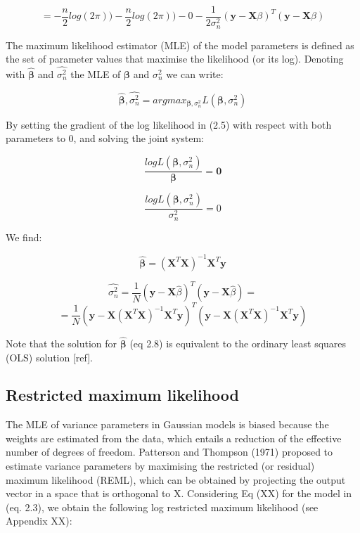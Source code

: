 \[= -\frac{n}{2}log(2\pi)) - \frac{n}{2}log(2\pi))- 0 - \frac{1}{2\sigma_n^2}(\mathbf{y}-\mathbf{X}\beta)^T(\mathbf{y}-\mathbf{X}\beta)  \]


The maximum likelihood estimator (MLE) of the model parameters is defined as the set of parameter values that maximise the likelihood (or its log). Denoting with $\hat{\boldsymbol{\beta}}$ and $\hat{\sigma_n^2}$ the MLE of $\boldsymbol{\beta}$ and $\sigma_n^2$ we can write:

\[ \hat{\boldsymbol{\beta}},\hat{\sigma_n^2} = argmax_{\boldsymbol{\beta},\sigma_n^2}L(\boldsymbol{\beta}, \sigma_n^2) \]

\vspace{2mm} 
By setting the gradient of the log likelihood in (2.5) with respect with both parameters to 0, and solving the joint system: 


\[ \dfrac{logL(\boldsymbol{\beta}, \sigma_n^2)}{\boldsymbol{\beta}} = \mathbf{0} \]

\[ \dfrac{logL(\boldsymbol{\beta}, \sigma_n^2)}{\sigma_n^2} = 0 \]


We find:

\[ \hat{\boldsymbol{\beta}} = (\mathbf{X}^T\mathbf{X})^{-1}\mathbf{X}^T\mathbf{y} \]

\[ \hat{\sigma_n^2}  = \frac{1}{N}(\mathbf{y}-\mathbf{X}\hat{\beta})^T(\mathbf{y}-\mathbf{X}\hat{\beta}) = \]
\[ = \frac{1}{N}(\mathbf{y}-\mathbf{X}(\mathbf{X}^T\mathbf{X})^{-1}\mathbf{X}^T\mathbf{y})^T(\mathbf{y}-\mathbf{X}(\mathbf{X}^T\mathbf{X})^{-1}\mathbf{X}^T\mathbf{y}) \]

\vspace{5mm} 
Note that the solution for $\hat{\boldsymbol{\beta}}$ (eq 2.8) is equivalent to the ordinary least squares (OLS) solution [ref].


\subsection{Restricted maximum likelihood}

The MLE of variance parameters in Gaussian models is biased because the weights are estimated from the data, which entails a reduction of the effective number of degrees of freedom. Patterson and Thompson (1971) proposed to estimate variance parameters by maximising the restricted (or residual) maximum likelihood (REML), which can be obtained by projecting the output vector in a space that is orthogonal to X. Considering Eq (XX) for the model in (eq. 2.3), we obtain the following log restricted maximum likelihood (see Appendix XX):



